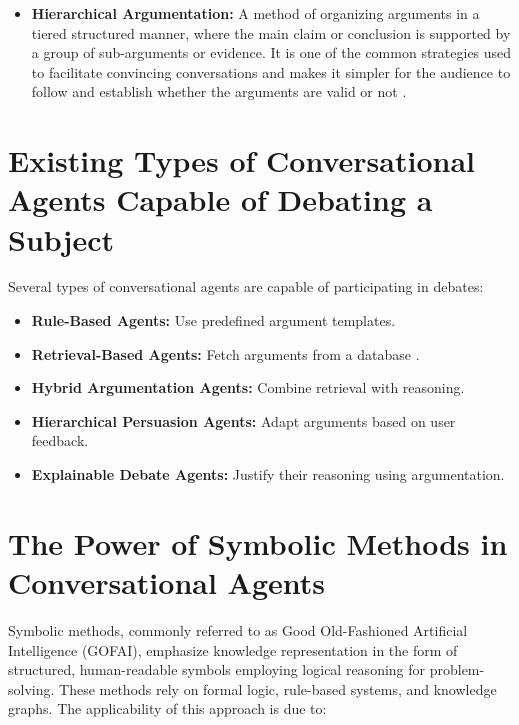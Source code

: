 \documentclass[conference]{IEEEtran}
\begin{document}
\begin{itemize}
    \item \textbf{Hierarchical Argumentation:} A method of organizing arguments in a tiered structured manner, where the main claim or conclusion is supported by a group of sub-arguments or evidence. It is one of the common strategies used to facilitate convincing conversations and makes it simpler for the audience to follow and establish whether the arguments are valid or not  \cite{b5}.
\end{itemize}

\section{Existing Types of Conversational Agents Capable of Debating a Subject}
Several types of conversational agents are capable of participating in debates:

\begin{itemize}
    \item \textbf{Rule-Based Agents:} Use predefined argument templates.
    \item \textbf{Retrieval-Based Agents:} Fetch arguments from a database \cite{b3}.
    \item \textbf{Hybrid Argumentation Agents:} Combine retrieval with reasoning.
    \item \textbf{Hierarchical Persuasion Agents:} Adapt arguments based on user feedback.
    \item \textbf{Explainable Debate Agents:} Justify their reasoning using argumentation.
\end{itemize}


\section{The Power of Symbolic Methods in Conversational Agents}
Symbolic methods, commonly referred to as Good Old-Fashioned Artificial Intelligence (GOFAI), emphasize knowledge representation in the form of structured, human-readable symbols employing logical reasoning for problem-solving. These methods rely on formal logic, rule-based systems, and knowledge graphs. The applicability of this approach is due to:
\end{document}
